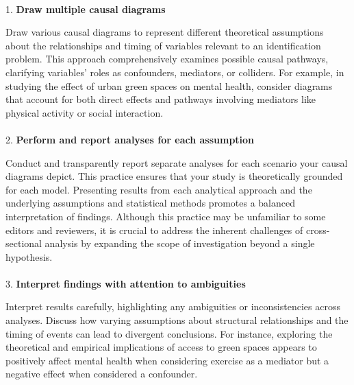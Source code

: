 \documentclass[
  single column]{article}
\makeatletter
\let\oldparagraph\paragraph
\renewcommand{\paragraph}{
    \@ifstar
      \xxxParagraphStar
      \xxxParagraphNoStar
  }
\newcommand{\xxxParagraphStar}[1]{\oldparagraph*{#1}\mbox{}}
\newcommand{\xxxParagraphNoStar}[1]{\oldparagraph{#1}\mbox{}}
\makeatother
\begin{document}
\paragraph{\texorpdfstring{1. \textbf{Draw multiple causal
diagrams}}{1. Draw multiple causal diagrams}}\label{draw-multiple-causal-diagrams}

Draw various causal diagrams to represent different theoretical
assumptions about the relationships and timing of variables relevant to
an identification problem. This approach comprehensively examines
possible causal pathways, clarifying variables' roles as confounders,
mediators, or colliders. For example, in studying the effect of urban
green spaces on mental health, consider diagrams that account for both
direct effects and pathways involving mediators like physical activity
or social interaction.

\paragraph{\texorpdfstring{2. \textbf{Perform and report analyses for
each
assumption}}{2. Perform and report analyses for each assumption}}\label{perform-and-report-analyses-for-each-assumption}

Conduct and transparently report separate analyses for each scenario
your causal diagrams depict. This practice ensures that your study is
theoretically grounded for each model. Presenting results from each
analytical approach and the underlying assumptions and statistical
methods promotes a balanced interpretation of findings. Although this
practice may be unfamiliar to some editors and reviewers, it is crucial
to address the inherent challenges of cross-sectional analysis by
expanding the scope of investigation beyond a single hypothesis.

\paragraph{\texorpdfstring{3. \textbf{Interpret findings with attention
to
ambiguities}}{3. Interpret findings with attention to ambiguities}}\label{interpret-findings-with-attention-to-ambiguities}

Interpret results carefully, highlighting any ambiguities or
inconsistencies across analyses. Discuss how varying assumptions about
structural relationships and the timing of events can lead to divergent
conclusions. For instance, exploring the theoretical and empirical
implications of access to green spaces appears to positively affect
mental health when considering exercise as a mediator but a negative
effect when considered a confounder.
\end{document}
